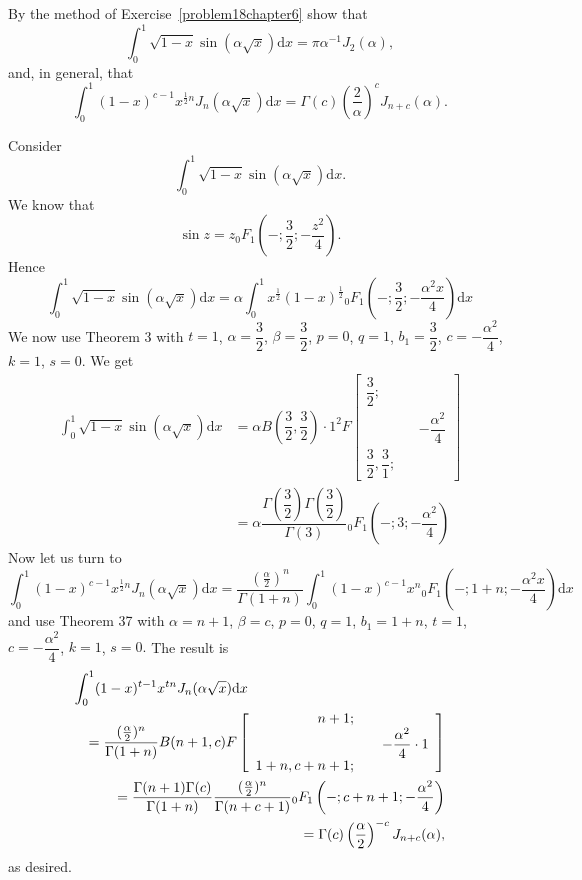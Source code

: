 \begin{problem} \label{problem19chapter6}
By the method of Exercise~\ref{problem18chapter6} show that
$$\displaystyle\int_0^1 \sqrt{1-x} \sin(\alpha \sqrt{x}) \mathrm{d}x = \pi \alpha^{-1}J_2(\alpha),$$
and, in general, that
$$\displaystyle\int_0^1 (1-x)^{c-1} x^{\frac{1}{2}n} J_n(\alpha \sqrt{x}) \mathrm{d}x = \Gamma(c) \left( \dfrac{2}{\alpha} \right)^c J_{n+c}(\alpha).$$
\end{problem}
\begin{solution}
Consider
$$\displaystyle\int_0^1 \sqrt{1-x} \sin(\alpha \sqrt{x}) \mathrm{d}x.$$
We know that
$$\sin z = z {}_0F_1 \left(-;\dfrac{3}{2}; -\dfrac{z^2}{4} \right).$$
Hence
$$\displaystyle\int_0^1 \sqrt{1-x} \sin(\alpha \sqrt{x}) \mathrm{d}x = \alpha \displaystyle\int_0^1 x^{\frac{1}{2}} (1-x)^{\frac{1}{2}} {}_0F_1 \left(-;\dfrac{3}{2}; -\dfrac{\alpha^2 x}{4} \right) \mathrm{d}x$$
We now use Theorem 3 with $t=1$, $\alpha = \dfrac{3}{2}$, $\beta = \dfrac{3}{2}$, $p=0$, $q=1$, $b_1 = \dfrac{3}{2}$, $c = -\dfrac{\alpha^2}{4}$, $k=1$, $s=0$. We get
$$\begin{array}{ll}
\displaystyle\int_0^1 \sqrt{1-x} \sin(\alpha \sqrt{x}) \mathrm{d}x &= \alpha B \left( \dfrac{3}{2}, \dfrac{3}{2} \right) \cdot 1^2 F \left[ \begin{array}{rlr}
\dfrac{3}{2}; & & \\
& & -\dfrac{\alpha^2}{4} \\
\dfrac{3}{2}, \dfrac{3}{1}; & & 
\end{array} \right] \\
&= \alpha \dfrac{\Gamma \left( \dfrac{3}{2} \right) \Gamma \left( \dfrac{3}{2} \right)}{\Gamma(3)} {}_0F_1 \left(-;3;-\dfrac{\alpha^2}{4} \right)
\end{array}$$
Now let us turn to
$$\displaystyle\int_0^1 \!(1-x)^{c-1} x^{\frac{1}{2}n} J_n(\alpha \sqrt{x}) \mathrm{d}x = \dfrac{(\frac{\alpha}{2})^n}{\Gamma(1+n)} \displaystyle\int_0^1 \!(1-x)^{c-1} x^n {}_0F_1 \left(-;1+n;-\dfrac{\alpha^2 x}{4} \right) \mathrm{d}x$$
and use Theorem 37 with $\alpha=n+1$, $\beta=c$, $p=0$, $q=1$, $b_1=1+n$, $t=1$, $c=-\dfrac{\alpha^2}{4}$, $k=1$, $s=0.$
The result is
\begin{eqnarray*}
\lefteqn{\displaystyle\int_0^1 (1-x)^{t-1} x^{tn} J_n(\alpha \sqrt{x}) \mathrm{d}x} \\
& &= \dfrac{(\frac{\alpha}{2})^n}{\Gamma(1+n)} B(n+1,c) F \left[ \begin{array}{rlr}
n+1; & & \\
& & -\dfrac{\alpha^2}{4} \cdot 1 \\
1+n, c+n+1;
\end{array} \right] \\
& &= \dfrac{\Gamma(n+1)\Gamma(c)}{\Gamma(1+n)} \dfrac{(\frac{\alpha}{2})^n}{\Gamma(n+c+1)} {}_0F_1 \left(-;c+n+1; - \dfrac{\alpha^2}{4} \right) \\
&&= \Gamma(c) \left( \dfrac{\alpha}{2} \right)^{-c} J_{n+c}(\alpha),
\end{eqnarray*}
as desired.
\end{solution}
